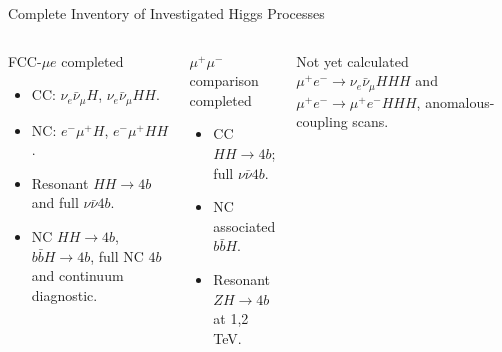 \documentclass[aspectratio=1610,english]{beamer}
\newcommand{\src}[1]{\vfill{\par\color{black!65}\fontsize{6.4}{7.4}\selectfont\emph{Source:} #1\par}}
\begin{document}
\begin{frame}[t]{Complete Inventory of Investigated Higgs Processes}
\small

\begin{columns}%
\begin{exampleblock}{FCC-$\mu e$ completed}
\begin{itemize}\item CC: $\nu_e\bar\nu_\mu H$, $\nu_e\bar\nu_\mu HH$.
\item NC: $e^-\mu^+H$, $e^-\mu^+HH$.
\item Resonant $HH\to4b$ and full $\nu\bar\nu4b$.
\item NC $HH\to4b$, $b\bar b H\to4b$, full NC $4b$ and continuum diagnostic.
\end{itemize}\end{exampleblock}
\begin{alertblock}{$\mu^+\mu^-$ comparison completed}
\begin{itemize}\item CC $HH\to4b$; full $\nu\bar\nu4b$.
\item NC associated $b\bar bH$.
\item Resonant $ZH\to4b$ at 1,2 TeV.
\end{itemize}\end{alertblock}
\begin{block}{Not yet calculated}
$\mu^+e^-\to\nu_e\bar\nu_\mu HHH$ and $\mu^+e^-\to\mu^+e^-HHH$, anomalous-coupling scans.
\end{block}
\end{columns}

\end{frame}
\end{document}
